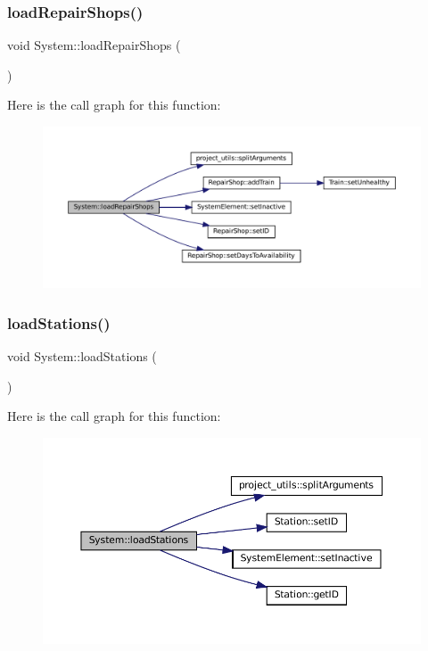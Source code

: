 \subsubsection{\texorpdfstring{load\+Repair\+Shops()}{loadRepairShops()}}
{\footnotesize\ttfamily void System\+::load\+Repair\+Shops (\begin{DoxyParamCaption}{ }\end{DoxyParamCaption})}

Here is the call graph for this function\+:
\nopagebreak
\begin{figure}[H]
\begin{center}
\leavevmode
\includegraphics[width=350pt]{classSystem_a53596ab10851974766ad4488375fdbb1_cgraph}
\end{center}
\end{figure}
\mbox{\label{classSystem_a017a8478b6ab45656f106cd2739848b4}} 
\subsubsection{\texorpdfstring{load\+Stations()}{loadStations()}}
{\footnotesize\ttfamily void System\+::load\+Stations (\begin{DoxyParamCaption}{ }\end{DoxyParamCaption})}

Here is the call graph for this function\+:
\nopagebreak
\begin{figure}[H]
\begin{center}
\leavevmode
\includegraphics[width=350pt]{classSystem_a017a8478b6ab45656f106cd2739848b4_cgraph}
\end{center}
\end{figure}
\mbox{\label{classSystem_a5c7631890b3099bf2c6d9ff10e25513b}} 
